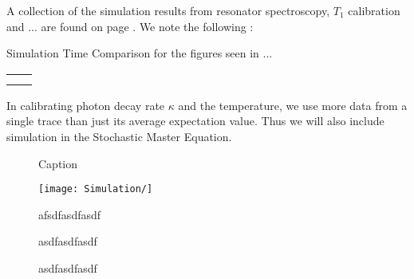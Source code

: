 A collection of the simulation results from resonator spectroscopy, $T_1$ calibration and ... are found on page \pageref{fig:big_figure_test}. We note the following :

\begin{margintable}
    \centering
    \caption{Simulation Time Comparison for the figures seen in  ... }
    \begin{tabular}{c|c}
         &  \\
         & 
    \end{tabular}
    \label{tab:my_label}
\end{margintable}

In calibrating photon decay rate $\kappa$ and the temperature, we use more data from a single trace than just its average expectation value. Thus we will also include simulation in the Stochastic Master Equation.   


\begin{figure}
    \centering
    \caption{Caption}
    \label{fig:enter-label}
\end{figure}



\begin{figure*}[h]
    \begin{minipage}{0.45\linewidth}
        \centering
        \texttt{[image: Simulation/]}
        \caption{afsdfasdfasdf}
    \end{minipage}
    \begin{minipage}{0.45\linewidth}
        \centering
        \caption{asdfasdfasdf}
    \end{minipage}
    \caption{asdfasdfasdf}
    \label{fig:calibrations_in_simulation}
\end{figure*}

